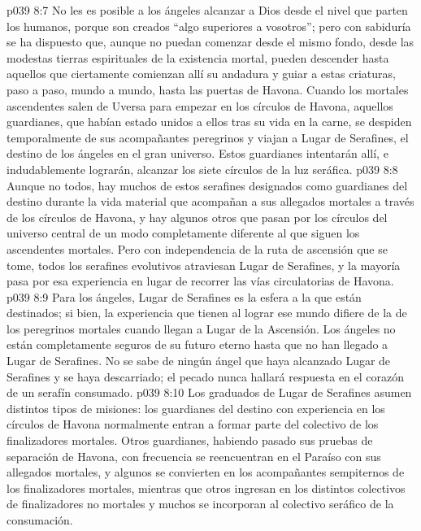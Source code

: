 \vs p039 8:7 \pc No les es posible a los ángeles alcanzar a Dios desde el nivel que parten los humanos, porque son creados “algo superiores a vosotros”; pero con sabiduría se ha dispuesto que, aunque no puedan comenzar desde el mismo fondo, desde las modestas tierras espirituales de la existencia mortal, pueden descender hasta aquellos que ciertamente comienzan allí su andadura y guiar a estas criaturas, paso a paso, mundo a mundo, hasta las puertas de Havona. Cuando los mortales ascendentes salen de Uversa para empezar en los círculos de Havona, aquellos guardianes, que habían estado unidos a ellos tras su vida en la carne, se despiden temporalmente de sus acompañantes peregrinos y viajan a Lugar de Serafines, el destino de los ángeles en el gran universo. Estos guardianes intentarán allí, e indudablemente lograrán, alcanzar los siete círculos de la luz seráfica.
\vs p039 8:8 Aunque no todos, hay muchos de estos serafines designados como guardianes del destino durante la vida material que acompañan a sus allegados mortales a través de los círculos de Havona, y hay algunos otros que pasan por los círculos del universo central de un modo completamente diferente al que siguen los ascendentes mortales. Pero con independencia de la ruta de ascensión que se tome, todos los serafines evolutivos atraviesan Lugar de Serafines, y la mayoría pasa por esa experiencia en lugar de recorrer las vías circulatorias de Havona.
\vs p039 8:9 \pc Para los ángeles, Lugar de Serafines es la esfera a la que están destinados; si bien, la experiencia que tienen al lograr ese mundo difiere de la de los peregrinos mortales cuando llegan a Lugar de la Ascensión. Los ángeles no están completamente seguros de su futuro eterno hasta que no han llegado a Lugar de Serafines. No se sabe de ningún ángel que haya alcanzado Lugar de Serafines y se haya descarriado; el pecado nunca hallará respuesta en el corazón de un serafín consumado.
\vs p039 8:10 Los graduados de Lugar de Serafines asumen distintos tipos de misiones: los guardianes del destino con experiencia en los círculos de Havona normalmente entran a formar parte del colectivo de los finalizadores mortales. Otros guardianes, habiendo pasado sus pruebas de separación de Havona, con frecuencia se reencuentran en el Paraíso con sus allegados mortales, y algunos se convierten en los acompañantes sempiternos de los finalizadores mortales, mientras que otros ingresan en los distintos colectivos de finalizadores no mortales y muchos se incorporan al colectivo seráfico de la consumación.
